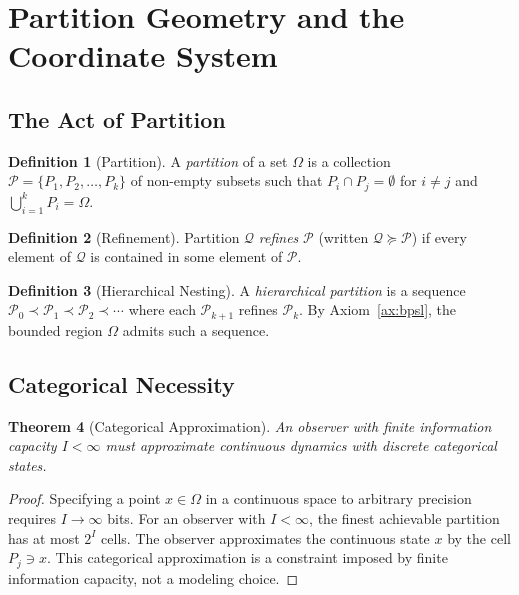 \documentclass[11pt,twocolumn,a4paper]{article}
\newtheorem{theorem}{Theorem}[section]
\theoremstyle{definition}
\newtheorem{definition}[theorem]{Definition}
\theoremstyle{remark}
\begin{document}
\section{Partition Geometry and the Coordinate System}
\label{sec:partition_geometry}

\subsection{The Act of Partition}

\begin{definition}[Partition]
\label{def:partition}
A \emph{partition} of a set $\Omega$ is a collection $\mathcal{P} = \{P_1, P_2, \ldots, P_k\}$ of non-empty subsets such that $P_i \cap P_j = \emptyset$ for $i \neq j$ and $\bigcup_{i=1}^{k} P_i = \Omega$.
\end{definition}

\begin{definition}[Refinement]
\label{def:refinement}
Partition $\mathcal{Q}$ \emph{refines} $\mathcal{P}$ (written $\mathcal{Q} \succeq \mathcal{P}$) if every element of $\mathcal{Q}$ is contained in some element of $\mathcal{P}$.
\end{definition}

\begin{definition}[Hierarchical Nesting]
\label{def:nesting}
A \emph{hierarchical partition} is a sequence $\mathcal{P}_0 \prec \mathcal{P}_1 \prec \mathcal{P}_2 \prec \cdots$ where each $\mathcal{P}_{k+1}$ refines $\mathcal{P}_k$. By Axiom~\ref{ax:bpsl}, the bounded region $\Omega$ admits such a sequence.
\end{definition}

\subsection{Categorical Necessity}

\begin{theorem}[Categorical Approximation]
\label{thm:categorical}
An observer with finite information capacity $I < \infty$ must approximate continuous dynamics with discrete categorical states.
\end{theorem}

\begin{proof}
Specifying a point $x \in \Omega$ in a continuous space to arbitrary precision requires $I \to \infty$ bits. For an observer with $I < \infty$, the finest achievable partition has at most $2^I$ cells. The observer approximates the continuous state $x$ by the cell $P_j \ni x$. This categorical approximation is a constraint imposed by finite information capacity, not a modeling choice.
\end{proof}
\end{document}
